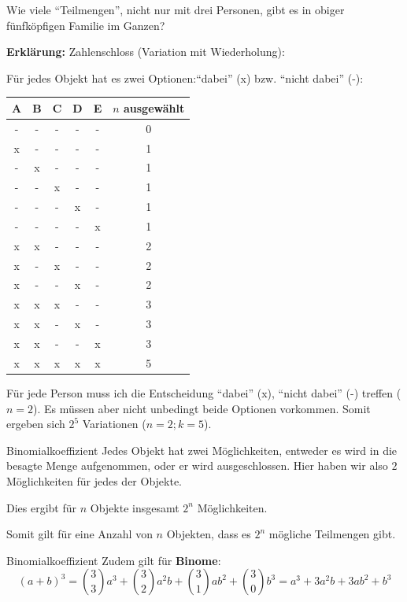  Wie viele ``Teilmengen'', nicht nur mit drei Personen, gibt es in obiger
  fünfköpfigen Familie im Ganzen?

    

\textbf{Erklärung:} Zahlenschloss (Variation mit Wiederholung):

Für jedes Objekt hat es zwei Optionen:``dabei'' (x) bzw. ``nicht dabei'' (-):

\begin{tabular}{ccccc|c}
A&B&C&D&E&$n$ ausgewählt \\\hline
-&-&-&-&-&0\\
x&-&-&-&-&1\\
-&x&-&-&-&1\\
-&-&x&-&-&1\\
-&-&-&x&-&1\\
-&-&-&-&x&1\\
x&x&-&-&-&2\\
x&-&x&-&-&2\\
x&-&-&x&-&2\\
\hline
\hline
x&x&x&-&-&3\\
x&x&-&x&-&3\\
x&x&-&-&x&3\\
\hline \hline
x&x&x&x&x&5\\\hline
\end{tabular}

Für jede Person muss ich die Entscheidung ``dabei'' (x), ``nicht dabei'' (-) treffen ($n=2$). Es müssen aber nicht unbedingt beide Optionen vorkommen. Somit ergeben sich $2^5$ Variationen ($n=2; k=5$).


\begin{bemerkung}{Binomialkoeffizient}{}
  Jedes Objekt hat zwei Möglichkeiten, entweder es wird in die besagte
  Menge aufgenommen, oder er wird ausgeschlossen. Hier haben wir also
  $2$ Möglichkeiten für jedes der Objekte.
  
  Dies ergibt für $n$ Objekte insgesamt $2^n$ Möglichkeiten.

  Somit gilt für eine Anzahl von $n$ Objekten, dass es $2^n$ mögliche
  Teilmengen gibt.
\end{bemerkung}
\begin{bemerkung}{Binomialkoeffizient}{}
  Zudem gilt für \textbf{Binome}:
  $$(a+b)^3 = {3\choose 3} a^3+ {3\choose 2} a^2b + {3\choose1} ab^2 + {3\choose 0}b^3 = a^3 + 3a^2b + 3ab^2 + b^3$$
  $$$$
  \end{bemerkung}
\newpage

